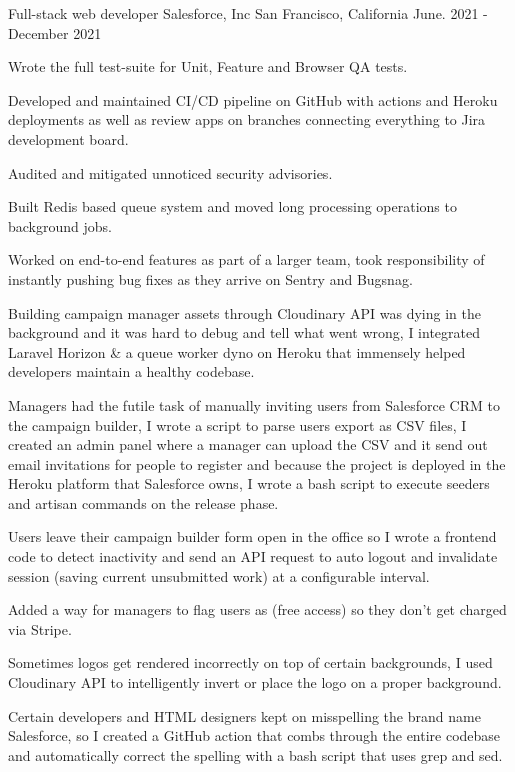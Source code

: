 \begin{cventries}
  \cventry
    {Full-stack web developer} %
    {Salesforce, Inc} %
    {San Francisco, California} %
    {June. 2021 - December 2021} %
    {
      \begin{cvitems} %
        \item {Wrote the full test-suite for Unit, Feature and Browser QA tests.}
        \item {Developed and maintained CI/CD pipeline on GitHub with actions and Heroku deployments as well as review apps on branches connecting everything to Jira development board.}
        \item {Audited and mitigated unnoticed security advisories.}
        \item {Built Redis based queue system and moved long processing operations to background jobs.}
        \item {Worked on end-to-end features as part of a larger team, took responsibility of instantly pushing bug fixes as they arrive on Sentry and Bugsnag.}
        \item {Building campaign manager assets through Cloudinary API was dying in the background and it was hard to debug and tell what went wrong, I integrated Laravel Horizon \& a queue worker dyno on Heroku that immensely helped developers maintain a healthy codebase.}
        \item {Managers had the futile task of manually inviting users from Salesforce CRM to the campaign builder, I wrote a script to parse users export as CSV files, I created an admin panel where a manager can upload the CSV and it send out email invitations for people to register and because the project is deployed in the Heroku platform that Salesforce owns, I wrote a bash script to execute seeders and artisan commands on the release phase.}
        \item {Users leave their campaign builder form open in the office so I wrote a frontend code to detect inactivity and send an API request to auto logout and invalidate session (saving current unsubmitted work) at a configurable interval.}
        \item {Added a way for managers to flag users as (free access) so they don't get charged via Stripe.}
        \item {Sometimes logos get rendered incorrectly on top of certain backgrounds, I used Cloudinary API to intelligently invert or place the logo on a proper background.}
        \item {Certain developers and HTML designers kept on misspelling the brand name Salesforce, so I created a GitHub action that combs through the entire codebase and automatically correct the spelling with a bash script that uses grep and sed.}
      \end{cvitems}
     }


\end{cventries}
